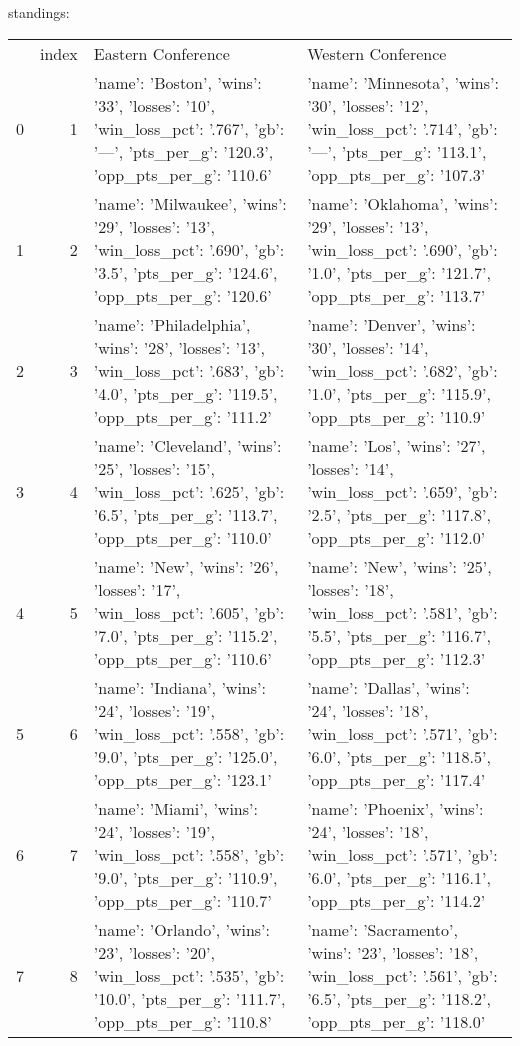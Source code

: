 {} standings:
\begin{tabular}{lrll}
 & index & Eastern Conference & Western Conference \\
0 & 1 & {'name': 'Boston', 'wins': '33', 'losses': '10', 'win_loss_pct': '.767', 'gb': '—', 'pts_per_g': '120.3', 'opp_pts_per_g': '110.6'} & {'name': 'Minnesota', 'wins': '30', 'losses': '12', 'win_loss_pct': '.714', 'gb': '—', 'pts_per_g': '113.1', 'opp_pts_per_g': '107.3'} \\
1 & 2 & {'name': 'Milwaukee', 'wins': '29', 'losses': '13', 'win_loss_pct': '.690', 'gb': '3.5', 'pts_per_g': '124.6', 'opp_pts_per_g': '120.6'} & {'name': 'Oklahoma', 'wins': '29', 'losses': '13', 'win_loss_pct': '.690', 'gb': '1.0', 'pts_per_g': '121.7', 'opp_pts_per_g': '113.7'} \\
2 & 3 & {'name': 'Philadelphia', 'wins': '28', 'losses': '13', 'win_loss_pct': '.683', 'gb': '4.0', 'pts_per_g': '119.5', 'opp_pts_per_g': '111.2'} & {'name': 'Denver', 'wins': '30', 'losses': '14', 'win_loss_pct': '.682', 'gb': '1.0', 'pts_per_g': '115.9', 'opp_pts_per_g': '110.9'} \\
3 & 4 & {'name': 'Cleveland', 'wins': '25', 'losses': '15', 'win_loss_pct': '.625', 'gb': '6.5', 'pts_per_g': '113.7', 'opp_pts_per_g': '110.0'} & {'name': 'Los', 'wins': '27', 'losses': '14', 'win_loss_pct': '.659', 'gb': '2.5', 'pts_per_g': '117.8', 'opp_pts_per_g': '112.0'} \\
4 & 5 & {'name': 'New', 'wins': '26', 'losses': '17', 'win_loss_pct': '.605', 'gb': '7.0', 'pts_per_g': '115.2', 'opp_pts_per_g': '110.6'} & {'name': 'New', 'wins': '25', 'losses': '18', 'win_loss_pct': '.581', 'gb': '5.5', 'pts_per_g': '116.7', 'opp_pts_per_g': '112.3'} \\
5 & 6 & {'name': 'Indiana', 'wins': '24', 'losses': '19', 'win_loss_pct': '.558', 'gb': '9.0', 'pts_per_g': '125.0', 'opp_pts_per_g': '123.1'} & {'name': 'Dallas', 'wins': '24', 'losses': '18', 'win_loss_pct': '.571', 'gb': '6.0', 'pts_per_g': '118.5', 'opp_pts_per_g': '117.4'} \\
6 & 7 & {'name': 'Miami', 'wins': '24', 'losses': '19', 'win_loss_pct': '.558', 'gb': '9.0', 'pts_per_g': '110.9', 'opp_pts_per_g': '110.7'} & {'name': 'Phoenix', 'wins': '24', 'losses': '18', 'win_loss_pct': '.571', 'gb': '6.0', 'pts_per_g': '116.1', 'opp_pts_per_g': '114.2'} \\
7 & 8 & {'name': 'Orlando', 'wins': '23', 'losses': '20', 'win_loss_pct': '.535', 'gb': '10.0', 'pts_per_g': '111.7', 'opp_pts_per_g': '110.8'} & {'name': 'Sacramento', 'wins': '23', 'losses': '18', 'win_loss_pct': '.561', 'gb': '6.5', 'pts_per_g': '118.2', 'opp_pts_per_g': '118.0'} \\

\end{tabular}

